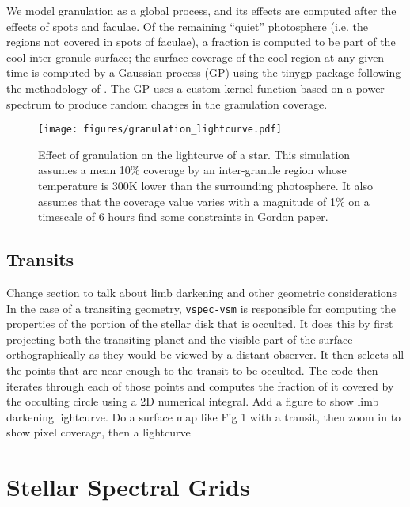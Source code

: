 \documentclass[twocolumn]{aastex631}
\newcommand{\TJ}[1]{\textcolor{tedcommentcolor}{#1}}
\begin{document}
We model granulation as a global process, and its effects are computed after the effects of spots and faculae. Of the remaining ``quiet'' photosphere (i.e. the regions not covered in spots of faculae), a fraction is computed to be part of the cool
inter-granule surface; the surface coverage of the cool region at any given time is computed by a Gaussian process (GP) using the {\sc tinygp} package \citep{foreman-mackey2024} following the methodology of \citet{gordon2020}. The GP uses a custom kernel function based on a power spectrum \citep{anderson1990,kallinger2014} to produce random changes in the granulation coverage.

\begin{figure}
    \centering
    \texttt{[image: figures/granulation\_lightcurve.pdf]}
    \caption{
        Effect of granulation on the lightcurve of a star. This simulation assumes a mean
        10\% coverage by an inter-granule region whose temperature is 300K lower than the surrounding photosphere. It also assumes that the coverage value varies with a magnitude of 1\% on a timescale of 6 hours \TJ{find some constraints in Gordon paper}.
        }
    \label{fig:gran_lc}
\end{figure}

\subsection{Transits}
\TJ{Change section to talk about limb darkening and other geometric considerations}
In the case of a transiting geometry, \texttt{vspec-vsm} is responsible for computing the properties of the portion of the stellar disk that is occulted. It does this by first projecting both the transiting planet and the visible part of the surface orthographically as they would be viewed by a distant observer. It then selects all the points that are near enough to the transit to be occulted. The code then iterates through each of those points and computes the fraction of it covered by the occulting circle using a 2D numerical integral. \TJ{Add a figure to show limb darkening lightcurve. Do a surface map like Fig 1 with a transit, then zoom in to show pixel coverage, then a lightcurve}

\section{Stellar Spectral Grids}
\label{sec:gridpolator}
\end{document}
